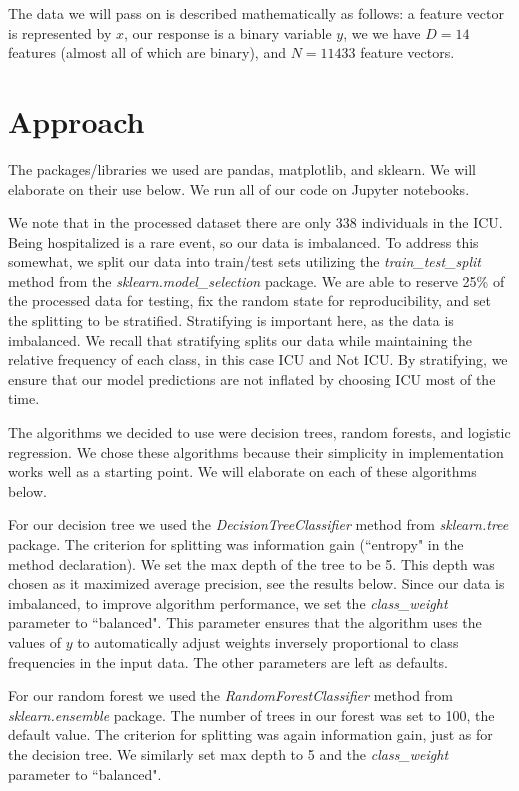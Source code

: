 \documentclass{article}
\begin{document}
The data we will pass on is described mathematically as follows: a feature vector is represented by $x$, our response is a binary variable $y$, we we have $D = 14$ features (almost all of which are binary), and $N = 11433$ feature vectors.

    
\section{Approach}
The packages/libraries we used are pandas, matplotlib, and sklearn. We will elaborate on their use below.  We run all of our code on Jupyter notebooks. 

We note that in the processed dataset there are only 338 individuals in the ICU. Being hospitalized is a rare event, so our data is imbalanced. To address this somewhat, we split our data into train/test sets utilizing the \emph{train\_test\_split} method from the \emph{sklearn.model\_selection} package. We are able to reserve 25\% of the processed data for testing, fix the random state for reproducibility, and set the splitting to be stratified. Stratifying is important here, as the data is imbalanced. We recall that stratifying splits our data while maintaining the relative frequency of each class, in this case ICU and Not ICU. By stratifying, we ensure that our model predictions are not inflated by choosing ICU most of the time.      

The algorithms we decided to use were decision trees, random forests, and logistic regression. We chose these algorithms because their simplicity in implementation works well as a starting point. We will elaborate on each of these algorithms below. 

For our decision tree we used the \emph{DecisionTreeClassifier} method from \emph{sklearn.tree} package. The criterion for splitting was information gain (``entropy" in the method declaration). We set the max depth of the tree to be 5. This depth was chosen as it maximized average precision, see the results below. Since our data is imbalanced, to improve algorithm performance, we set the \emph{class\_weight} parameter to ``balanced". This parameter ensures that the algorithm uses the values of $y$ to automatically adjust weights inversely proportional to class frequencies in the input data. The other parameters are left as defaults.                                 

For our random forest we used the \emph{RandomForestClassifier} method from \emph{sklearn.ensemble} package. The number of trees in our forest was set to 100, the default value. The criterion for splitting was again information gain, just as for the decision tree. We similarly set max depth to 5 and the \emph{class\_weight} parameter to ``balanced".
\end{document}
